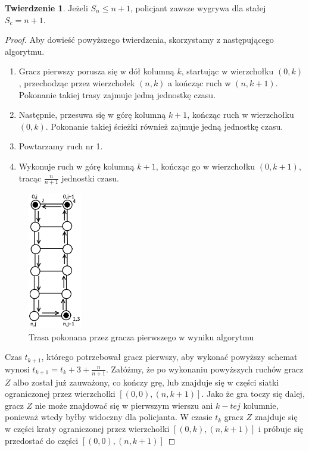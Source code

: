 \documentclass[brudnopis]{xmgr}
\theoremstyle{definition}
\newtheorem{Twierdzenie}{Twierdzenie}
\begin{document}
\begin{Twierdzenie} \cite{poscig}
	Jeżeli $S_n \le n + 1$, policjant zawsze wygrywa dla stałej $S_c = n + 1$.
\end{Twierdzenie}
\begin{proof}
	Aby dowieść powyższego twierdzenia, skorzystamy z następującego algorytmu.
	\begin{enumerate}
		\item Gracz pierwszy porusza się w dół kolumną $k$, startując w wierzchołku $(0,k)$, przechodząc przez wierzchołek $(n, k)$ a kończąc ruch w $(n, k + 1)$. Pokonanie takiej trasy zajmuje jedną jednostkę czasu.
		\item Następnie, przesuwa się w górę kolumną $k + 1$, kończąc ruch w wierzchołku $(0,k)$. Pokonanie takiej ścieżki również zajmuje jedną jednostkę czasu.
		\item Powtarzamy ruch nr 1.
		\item Wykonuje ruch w górę kolumną $k + 1$, kończąc go w wierzchołku $(0,k + 1)$, tracąc $\frac{n}{n+1}$ jednostki czasu.
	\end{enumerate}
	\begin{figure}[ht!]
	  \centering
	  \includegraphics[height=6cm]{rysunki/schemat_ruchu.png}
	  \caption{Trasa pokonana przez gracza pierwszego w wyniku algorytmu}
	\end{figure} 

	Czas $t_{k+1}$, którego potrzebował gracz pierwszy, aby wykonać powyższy schemat wynosi $t_{k+1} = t_k + 3 + \frac{n}{n+1}$.
	Załóżmy, że po wykonaniu powyższych ruchów gracz $Z$ albo został już zauważony, co kończy grę, lub znajduje się w części siatki ograniczonej przez wierzchołki $[(0,0), (n, k + 1)]$. 
	\indent Jako że gra toczy się dalej, gracz $Z$ nie może znajdować się w pierwszym wierszu ani $k-tej$ kolumnie, ponieważ wtedy byłby widoczny dla policjanta. W czasie $t_k$ gracz $Z$ znajduje się w części kraty ograniczonej przez wierzchołki $[(0,k), (n, k + 1)]$ i próbuje się przedostać do części $[(0,0), (n, k + 1)]$ 


\end{proof}
\end{document}

